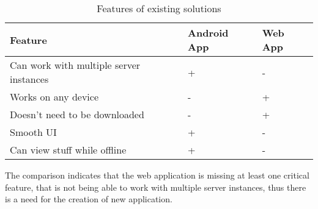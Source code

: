 \begin{table}[ht]\centering
\caption[Existing solutions]{Features of existing solutions}\label{tab:existingSolutions}
\begin{tabular}{l|l|l}
\hline
\textbf{Feature} & \textbf{Android App} & \textbf{Web App} \\ \hline
Can work with multiple server instances & + & - \\ \hline
Works on any device & - & + \\ \hline
Doesn't need to be downloaded & - & + \\ \hline
Smooth UI & + & - \\ \hline
Can view stuff while offline & + & - \\ \hline
\end{tabular}
\end{table}

The comparison indicates that the web application is missing at least one critical feature, that is not being able to work with multiple server instances, thus there is a need for the creation of new application.